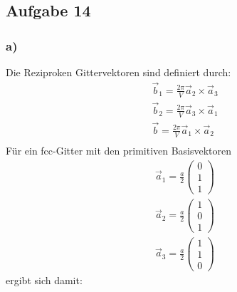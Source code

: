 \subsection*{Aufgabe 14}
\subsubsection*{a)}
Die Reziproken Gittervektoren sind definiert durch:
\begin{align*}
\vec{b}_1 = \frac{2\pi}{V} \vec{a}_2\times\vec{a}_3\\
\vec{b}_2 = \frac{2\pi}{V} \vec{a}_3\times\vec{a}_1\\
\vec{b} = \frac{2\pi}{V} \vec{a}_1\times\vec{a}_2\\
\end{align*}
Für ein fcc-Gitter mit den primitiven Basisvektoren
\begin{align*}
\vec{a}_1=\frac{a}{2}\begin{pmatrix}0\\1\\1\end{pmatrix}\\
\vec{a}_2=\frac{a}{2}\begin{pmatrix}1\\0\\1\end{pmatrix}\\
\vec{a}_3=\frac{a}{2}\begin{pmatrix}1\\1\\0\end{pmatrix}
\end{align*}
ergibt sich damit:

